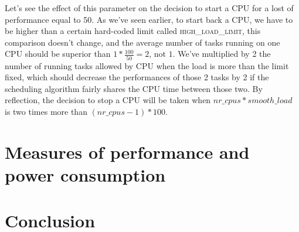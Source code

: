 \documentclass{report}
\begin{document}
Let's see the effect of this parameter on the decision to start a CPU for a
lost of performance equal to 50. As we've seen earlier, to start back a CPU, we
have to be higher than a certain hard-coded limit called
\textsc{high\_load\_limit}, this comparison doesn't change, and the average
number of tasks running on one CPU should be superior than $1 * \frac{100}{50}
= 2$, not $1$. We've multiplied by 2 the number of running tasks allowed by CPU
when the load is more than the limit fixed, which should decrease the
performances of those 2 tasks by 2 if the scheduling algorithm fairly shares
the CPU time between those two. By reflection, the decision to stop a CPU will
be taken when $nr\_cpus * smooth\_load$ is two times more than $(nr\_cpus - 1)
* 100$.

\chapter{Measures of performance and power consumption}

\chapter{Conclusion}



\end{document}
